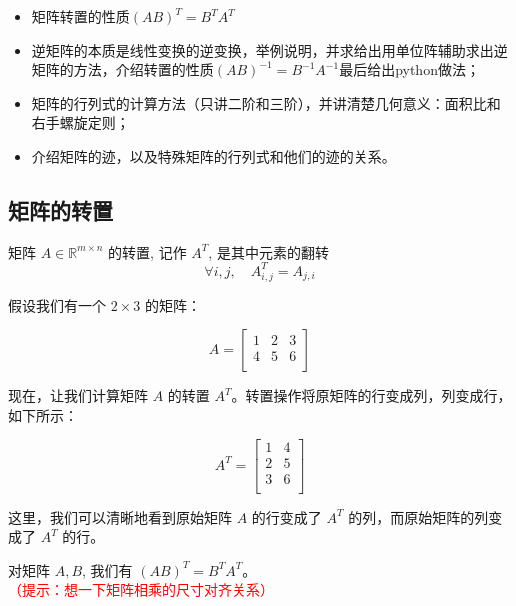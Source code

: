 \begin{proposition}[TODO]

\begin{itemize}
    \item  矩阵转置的性质$(AB)^{T}=B^{T} A^{T}$
    \item 逆矩阵的本质是线性变换的逆变换，举例说明，并求给出用单位阵辅助求出逆矩阵的方法，介绍转置的性质$(AB)^{-1}=B^{-1} A^{-1}$最后给出python做法；
    \item 矩阵的行列式的计算方法（只讲二阶和三阶），并讲清楚几何意义：面积比和右手螺旋定则；
    \item 介绍矩阵的迹，以及特殊矩阵的行列式和他们的迹的关系。
\end{itemize}

\end{proposition}

\subsection{矩阵的转置}

\begin{definition}
    
矩阵 $A \in \mathbb{R}^{m \times n}$ 的转置, 记作 $A^T$, 是其中元素的翻转
$$
\forall i, j, \quad A_{i, j}^T=A_{j, i}
$$
\end{definition}

\begin{exercise}
    假设我们有一个 $2 \times 3$ 的矩阵：

$$
A = \begin{bmatrix}
1 & 2 & 3 \\
4 & 5 & 6 \\
\end{bmatrix}
$$

现在，让我们计算矩阵 $A$ 的转置 $A^T$。转置操作将原矩阵的行变成列，列变成行，如下所示：

$$
A^T = \begin{bmatrix}
1 & 4 \\
2 & 5 \\
3 & 6 \\
\end{bmatrix}
$$

这里，我们可以清晰地看到原始矩阵 $A$ 的行变成了 $A^T$ 的列，而原始矩阵的列变成了 $A^T$ 的行。

\end{exercise}

\begin{theorem}[转置运算的性质] \label{thm:transpose-property}
    对矩阵 $A, B$, 我们有 $(A B)^T=B^T A^T$。\textcolor{red}{（提示：想一下矩阵相乘的尺寸对齐关系）}
\end{theorem}

